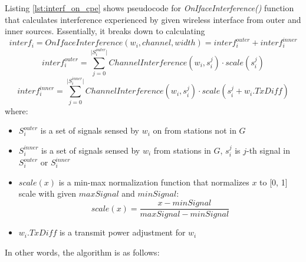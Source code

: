 Listing \ref{lst:interf_on_cpe} shows pseudocode for \textit{OnIfaceInterference()} function that calculates interference experienced by given wireless interface from outer and inner sources.
Essentially, it breaks down to calculating
\begin{equation}
    interf_i = OnIfaceInterference(w_i, channel, width) = interf^{outer}_i + interf^{inner}_i
\end{equation}
\begin{equation}
    interf^{outer}_i = \sum_{j=0}^{\lvert S^{outer}_i \rvert} ChannelInterference(w_i, s^{j}_i) \cdot scale(s^j_i)
\end{equation}
\begin{equation}
    interf^{inner}_i = \sum_{j=0}^{\lvert S^{inner}_i \rvert} ChannelInterference(w_i, s^{j}_i) \cdot scale(s^j_i + w_i.TxDiff)
\end{equation}
where:
\begin{itemize}
    \item $S^{outer}_i$ is a set of signals sensed by $w_i$ on from stations not in $G$
    \item $S^{inner}_i$ is a set of signals sensed by $w_i$ from stations in $G$, $s^j_i$ is $j$-th signal in $S^{outer}_i$ or $S^{inner}_i$
    \item $scale(x)$ is a min-max normalization function that normalizes $x$ to [0, 1] scale with given $maxSignal$ and $minSignal$:
        \begin{equation} scale(x) = \frac{x - minSignal}{maxSignal - minSignal} \end{equation}
    \item $w_i.TxDiff$ is a transmit power adjustment for $w_i$
\end{itemize}
In other words, the algorithm is as follows:

